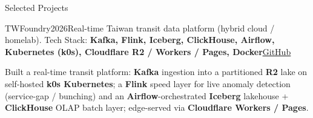 \documentclass[
	10pt, %
]{resume} %
\begin{document}

\begin{rSection}{Selected Projects}
\begin{rSubsection}{TWFoundry}{2026}{Real-time Taiwan transit data platform (hybrid cloud / homelab). Tech Stack: {\color{teal}\textbf{Kafka, Flink, Iceberg, ClickHouse, Airflow, Kubernetes (k0s), Cloudflare R2 / Workers / Pages, Docker}}}{{\color{teal}\underline{\href{https://github.com/unknowntpo/twfoundry}{GitHub}}}}
		\item Built a real-time transit platform: \textbf{Kafka} ingestion into a partitioned \textbf{R2} lake on self-hosted \textbf{k0s Kubernetes}; a \textbf{Flink} speed layer for live anomaly detection (service-gap / bunching) and an \textbf{Airflow}-orchestrated \textbf{Iceberg} lakehouse + \textbf{ClickHouse} OLAP batch layer; edge-served via \textbf{Cloudflare Workers / Pages}.
	\end{rSubsection}
\end{rSection}

\end{document}
